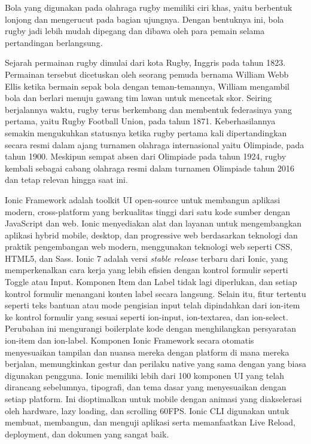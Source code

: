 \documentclass[a4paper,twoside]{article}
\begin{document}
Bola yang digunakan pada olahraga rugby memiliki ciri khas, yaitu berbentuk lonjong dan mengerucut pada bagian ujungnya. Dengan bentuknya ini, bola rugby jadi lebih mudah dipegang dan dibawa oleh para pemain selama pertandingan berlangsung.

Sejarah permainan rugby dimulai dari kota Rugby, Inggris pada tahun 1823. Permainan tersebut dicetuskan oleh seorang pemuda bernama William Webb Ellis ketika bermain sepak bola dengan teman-temannya, William mengambil bola dan berlari menuju gawang tim lawan untuk mencetak skor. Seiring berjalannya waktu, rugby terus berkembang dan membentuk federasinya yang pertama, yaitu Rugby Football Union, pada tahun 1871. Keberhasilannya semakin mengukuhkan statusnya ketika rugby pertama kali dipertandingkan secara resmi dalam ajang turnamen olahraga internasional yaitu Olimpiade, pada tahun 1900. Meskipun sempat absen dari Olimpiade pada tahun 1924, rugby kembali sebagai cabang olahraga resmi dalam turnamen Olimpiade tahun 2016 dan tetap relevan hingga saat ini.

Ionic Framework adalah toolkit UI open-source untuk membangun aplikasi modern, cross-platform yang berkualitas tinggi dari satu kode sumber dengan JavaScript dan web. Ionic menyediakan alat dan layanan untuk mengembangkan aplikasi hybrid mobile, desktop, dan progressive web berdasarkan teknologi dan praktik pengembangan web modern, menggunakan teknologi web seperti CSS, HTML5, dan Sass. Ionic 7 adalah versi \textit{stable release} terbaru dari Ionic, yang memperkenalkan cara kerja yang lebih efisien dengan kontrol formulir seperti Toggle atau Input. Komponen Item dan Label tidak lagi diperlukan, dan setiap kontrol formulir menangani konten label secara langsung. Selain itu, fitur tertentu seperti teks bantuan atau mode pengisian input telah dipindahkan dari ion-item ke kontrol formulir yang sesuai seperti ion-input, ion-textarea, dan ion-select. Perubahan ini mengurangi boilerplate kode dengan menghilangkan persyaratan ion-item dan ion-label. Komponen Ionic Framework secara otomatis menyesuaikan tampilan dan nuansa mereka dengan platform di mana mereka berjalan, memungkinkan gestur dan perilaku native yang sama dengan yang biasa digunakan pengguna. Ionic memiliki lebih dari 100 komponen UI yang telah dirancang sebelumnya, tipografi, dan tema dasar yang menyesuaikan dengan setiap platform. Ini dioptimalkan untuk mobile dengan animasi yang diakselerasi oleh hardware, lazy loading, dan scrolling 60FPS. Ionic CLI digunakan untuk membuat, membangun, dan menguji aplikasi serta memanfaatkan Live Reload, deployment, dan dokumen yang sangat baik.
\end{document}
